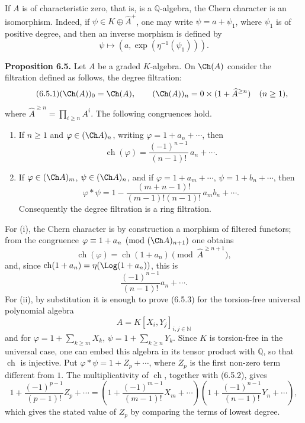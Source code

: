 \documentclass[11pt]{article}
\newcommand{\ch}{\operatorname{ch}}
\providecommand{\ch}{\operatorname{ch}}
\begin{document}
If \(A\) is of characteristic zero, that is, is a \(\mathbb Q\)-algebra, the Chern character is an isomorphism. Indeed, if \(\psi\in K\oplus\widehat A^+\), one may write \(\psi=a+\psi_1\), where \(\psi_1\) is of positive degree, and then an inverse morphism is defined by
\[
  \psi\longmapsto (a,\exp(\eta^{-1}(\psi_1))).
\]

\textbf{Proposition 6.5.} Let \(A\) be a graded \(K\)-algebra. On \(\Ch(A)\) consider the filtration defined as follows, the degree filtration:
\begin{equation}\tag{6.5.1}
  (\Ch(A))_0=\Ch(A),\qquad
  (\Ch(A))_n=0\times(1+\widehat A^{\ge n})\quad(n\ge1),
\end{equation}
where \(\widehat A^{\ge n}=\prod_{i\ge n}A^i\). The following congruences hold.

\begin{enumerate}[label=\roman*)]
\item If \(n\ge1\) and \(\varphi\in(\Ch A)_n\), writing \(\varphi=1+a_n+\cdots\), then
\begin{equation}\tag{6.5.2}
  \ch(\varphi)=\frac{(-1)^{n-1}}{(n-1)!}\,a_n+\cdots .
\end{equation}

\item If \(\varphi\in(\Ch A)_m\), \(\psi\in(\Ch A)_n\), and if
\(\varphi=1+a_m+\cdots\), \(\psi=1+b_n+\cdots\), then
\begin{equation}\tag{6.5.3}
  \varphi*\psi
  =
  1-\frac{(m+n-1)!}{(m-1)!(n-1)!}\,a_m b_n+\cdots .
\end{equation}
Consequently the degree filtration is a ring filtration.
\end{enumerate}

For (i), the Chern character is by construction a morphism of filtered functors; from the congruence \(\varphi\equiv1+a_n\pmod{(\Ch A)_{n+1}}\) one obtains
\[
  \ch(\varphi)=\ch(1+a_n)\pmod{\widehat A^{\ge n+1}},
\]
and, since \(\ch(1+a_n)=\eta(\Log(1+a_n))\), this is
\[
  \frac{(-1)^{n-1}}{(n-1)!}a_n+\cdots .
\]
For (ii), by substitution it is enough to prove (6.5.3) for the torsion-free universal polynomial algebra
\[
 A=K[X_i,Y_j]_{i,j\in\mathbb N}
\]
and for \(\varphi=1+\sum_{k\ge m}X_k\), \(\psi=1+\sum_{k\ge n}Y_k\). Since \(K\) is torsion-free in the universal case, one can embed this algebra in its tensor product with \(\mathbb Q\), so that \(\ch\) is injective. Put \(\varphi*\psi=1+Z_p+\cdots\), where \(Z_p\) is the first non-zero term different from \(1\). The multiplicativity of \(\ch\), together with (6.5.2), gives
\[
  1+\frac{(-1)^{p-1}}{(p-1)!}Z_p+\cdots
  =
  \left(1+\frac{(-1)^{m-1}}{(m-1)!}X_m+\cdots\right)
  \left(1+\frac{(-1)^{n-1}}{(n-1)!}Y_n+\cdots\right),
\]
which gives the stated value of \(Z_p\) by comparing the terms of lowest degree.
\end{document}
